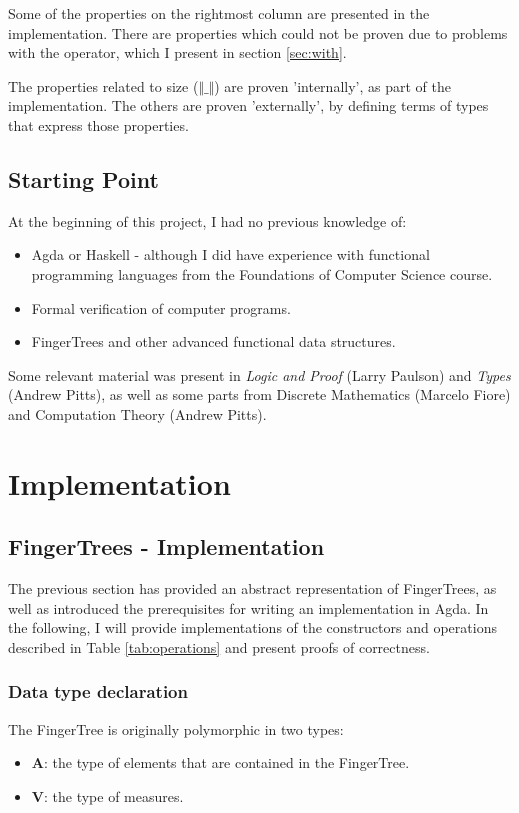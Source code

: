 \documentclass[12pt,twoside,notitlepage]{report}
\begin{document}
Some of the properties on the rightmost column are  presented in the implementation. There are properties which could not be proven due to problems with the  operator, which I  present in section \ref{sec:with}.

The properties related to size ($\Vert\_\Vert$) are proven 'internally', as part of the implementation. The others are proven 'externally', by defining terms of types that express those properties. 

\section{Starting Point}

At the beginning of this project, I had no previous knowledge of:
\begin{itemize}
 \item Agda or Haskell - although I did have experience with functional programming languages from the Foundations of Computer Science course.
 \item Formal verification of computer programs.
 \item FingerTrees and other advanced functional data structures.
\end{itemize}

Some relevant material was present in \textit{Logic and Proof} (Larry Paulson) and \textit{Types} (Andrew Pitts), as well as some parts from Discrete Mathematics (Marcelo Fiore) and Computation Theory (Andrew Pitts). 

\chapter{Implementation}

\section{FingerTrees - Implementation}

The previous section has provided an abstract representation of FingerTrees, as well as introduced the prerequisites for writing an implementation in Agda. In the following, I will provide implementations of the constructors and operations described in Table \ref{tab:operations} and present proofs of correctness. 

\subsection{Data type declaration}
\label{sec:ftdecl}
The FingerTree is originally polymorphic in two types:
\begin{itemize}
\item \textbf{A}: the type of elements that are contained in the FingerTree.
\item \textbf{V}: the type of measures. 
\end{itemize} 
\end{document}
